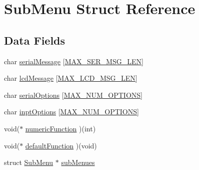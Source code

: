 \hypertarget{struct_sub_menu}{\section{Sub\+Menu Struct Reference}
\label{struct_sub_menu}
}
\subsection*{Data Fields}
\begin{DoxyCompactItemize}
\item 
char \hyperlink{struct_sub_menu_a24706f7b55951b0e21967a256e107936}{serial\+Message} \mbox{[}\hyperlink{_menusystem2_8c_af3a7cb33a5ae7392934b3197ac67e080}{M\+A\+X\+\_\+\+S\+E\+R\+\_\+\+M\+S\+G\+\_\+\+L\+E\+N}\mbox{]}
\item 
char \hyperlink{struct_sub_menu_a10ce8be3d2bbadbc9c262b6be4bb3aec}{lcd\+Message} \mbox{[}\hyperlink{_menusystem2_8c_a803e4f9d2e28d9ab24055cb970ea12c3}{M\+A\+X\+\_\+\+L\+C\+D\+\_\+\+M\+S\+G\+\_\+\+L\+E\+N}\mbox{]}
\item 
char \hyperlink{struct_sub_menu_adcfcbb5b5340baf34c70fb8f4cc66f72}{serial\+Options} \mbox{[}\hyperlink{_menusystem2_8c_ab86e62ee54aa604cfbdc4d3048c2845d}{M\+A\+X\+\_\+\+N\+U\+M\+\_\+\+O\+P\+T\+I\+O\+N\+S}\mbox{]}
\item 
char \hyperlink{struct_sub_menu_aef0980fb751ef312c4ff945539aa3cd4}{inpt\+Options} \mbox{[}\hyperlink{_menusystem2_8c_ab86e62ee54aa604cfbdc4d3048c2845d}{M\+A\+X\+\_\+\+N\+U\+M\+\_\+\+O\+P\+T\+I\+O\+N\+S}\mbox{]}
\item 
void($\ast$ \hyperlink{struct_sub_menu_a1dae2f8dad8e2d2a30b13ee69ea542db}{numeric\+Function} )(int)
\item 
void($\ast$ \hyperlink{struct_sub_menu_ad86a4714605654261200ef4194e1657c}{default\+Function} )(void)
\item 
struct \hyperlink{struct_sub_menu}{Sub\+Menu} $\ast$ \hyperlink{struct_sub_menu_a915aa121e09e4c3f914dc59727f390e3}{sub\+Menues}
\end{DoxyCompactItemize}


